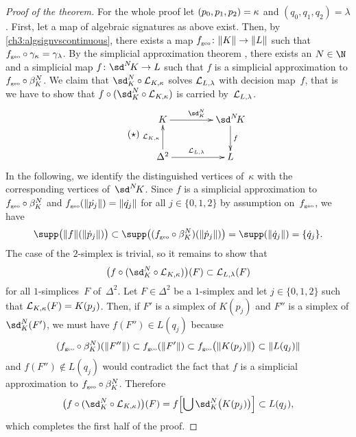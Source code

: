 \begin{proof}[Proof of the theorem]
    \newcommand{\sdNkappa}{\sd^N\!\kappa}
    For the whole proof let $(p_0,p_1,p_2) = \kappa$ and $(q_0,q_1,q_2) = \lambda$.
    First, let a map of algebraic signatures as above exist. Then,
    by \cref{ch3:algsignvscontinuous}, there exists a map
    $f_{\scriptscriptstyle\mathrm{geo}}\colon\lVert K\rVert\to\lVert L\rVert$ such that
    $f_\geo\after\gamma_\kappa = \gamma_\lambda$. By the simplicial
    approximation theorem , there exists an $N\in\N$ and a
    simplicial map $f\colon\sdNK \to L$ such that $f$ is a simplicial
    approximation to $f_\geo\after\beta_K^N$.
    We claim that $\sd_K^N\after\Loop{K,\kappa}$
    solves $\mathcal{L}_{L,\lambda}$ with decision map~$f$,
    that is we have to show that $f\after(\sd_K^N\after\Loop{K,\kappa})$
    is carried by~$\mathcal{L}_{L,\lambda}$.
    \[ \tag{$\star$} \label{ch3:classification:proof:star}
        \begin{gathered}
            \xymatrix@C=1.5cm{
                K \ar[r]^{\sd_K^N} & \sdNK \ar[d]^-f
                \\
                \Delta^2 \ar[u]^-{\Loop{K,\kappa}} \ar[r]^{\Loop{L,\lambda}} & L
            }
        \end{gathered}
    \]
    In the following, we identify the distinguished vertices of~$\kappa$ with
    the corresponding vertices of~$\sdNK$. Since $f$ is a simplicial
    approximation to $f_\geo\after\beta_K^N$ and $f_{\scriptscriptstyle\mathrm{geo}}(\lVert\dot{p_j}\rVert) =
    \lVert\dot{q_j}\rVert$ for all $j\in\{0,1,2\}$ by assumption on~$f_{\scriptscriptstyle\mathrm{geo}}$, we have
    \[ \supp\bigl(\geom{f}(\geom{\dot{p}_j})\bigr)
        \subset \supp\bigl( (f_\geo\after\beta_K^N)(\geom{\dot{p}_j}) \bigr)
        = \supp(\geom{\dot{q}_j}) = \{\dot{q}_j\}
    . \]
    The case of the $2$-simplex is trivial, so it remains to show
    that
    \[ \bigl(f\after(\sd_K^N\after\Loop{K,\kappa})\bigr)(F)
        \subset \Loop{L,\lambda}(F)
    \]
    for all $1$-simplices~$F$ of~$\Delta^2$. Let $F\in\Delta^2$ be a $1$-simplex
    and let $j\in\{0,1,2\}$ such that $\mathcal{L}_{K,\kappa}(F) = K(p_j)$. Then, if
    $F'$ is a simplex of $K(p_j)$ and $F''$ is a simplex of $\sd_K^N(F')$, we must have
    $f(F'')\in L(q_j)$ because
    \[ (f_\geo\after\beta_K^N)(\geom{F''}) \subset f_\geo(\geom{F'})
        \subset f_\geo\bigl(\geom{K(p_j)}\bigr) \subset \geom{L(q_j)}
    \]
    and $f(F'')\notin L(q_j)$ would contradict the fact that $f$ is
    a simplicial approximation to $f_\geo\after\beta_K^N$. Therefore
    \[ \bigl(f\after(\sd_K^N\after\Loop{K,\kappa})\bigr)(F)
        = f\Bigl[ \bigcup \sd_K^N\bigl(K(p_j)\bigr) \Bigr]
        \subset L(q_j)
    , \]
    which completes the first half of the proof.
    

\end{proof}
